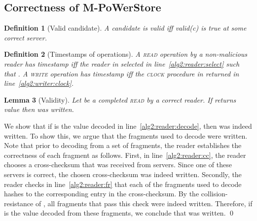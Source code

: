 \documentclass[10pt,conference,compsocconf]{IEEEtran}
\newcommand{\mprotocol}{M-PoWerStore}
\newtheorem{defn}{Definition}[section]
\newtheorem{la}[defn]{Lemma}
\newenvironment{prooff}{\vspace{1ex}\noindent{\bf Proof:}\hspace{0.5em}}
	{\hfill\qed\vspace{1em}}
\begin{document}
\subsection{Correctness of \mprotocol}

\begin{defn}[Valid candidate] \label{def2:validcand}
A candidate  is \emph{valid} iff \emph{\textsf{valid}(c)} is true at some correct server.
\end{defn}

\begin{defn}[Timestamps of operations]
A \textsc{read} operation  by a non-malicious reader has timestamp  iff the reader in  selected 
in line~\ref{alg2:reader:select} such that . A \textsc{write} operation  has timestamp  iff the \textsc{clock} procedure in  returned  in line~\ref{alg2:writer:clock}.
\end{defn}

\begin{la}[Validity]\label{la2:validity}
Let  be a completed \textsc{read} by a correct reader. If  returns value  then  was written.
\end{la}
\begin{prooff} We show that if  is the value decoded in line~\ref{alg2:reader:decode}, then  was indeed written. To show this, we argue that the fragments used to decode  were written. Note that prior to decoding  from a set of fragments, the reader establishes the correctness of each fragment as follows. First, in line~\ref{alg2:reader:cc}, the reader chooses a cross-checksum that was received from  servers. Since one of these servers is correct, the chosen cross-checksum was indeed written. Secondly, the reader checks in line~\ref{alg2:reader:fr} that each of the  fragments used to decode  hashes to the corresponding entry in the cross-checksum.  By the collision-resistance of , all fragments that pass this check were indeed written. Therefore, if  is the value decoded from these fragments, we conclude that  was written.
\end{prooff}
\end{document}
